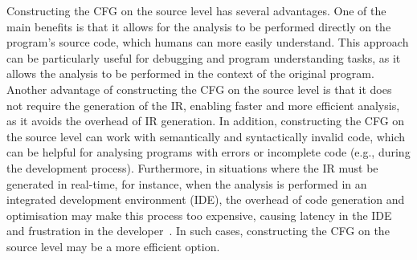 Constructing the CFG on the source level has several advantages.
One of the main beneﬁts is that it allows for the analysis to be performed directly on 
the program's source code, which humans can more easily understand.
This approach can be particularly useful for debugging and program understanding tasks,
as it allows the analysis to be performed in the context of the original program.
Another advantage of constructing the CFG on the source level is that it does not
require the generation of the IR, enabling faster and more efficient analysis,
as it avoids the overhead of IR generation.
In addition, constructing the CFG on the source level can work with semantically
and syntactically invalid code, which can be helpful for analysing programs with
errors or incomplete code (e.g., during the development process).
Furthermore, in situations where the IR must be generated in real-time,
for instance, when the analysis is performed in an integrated development environment (IDE),
the overhead of code generation and optimisation may make this process too expensive,
causing latency in the IDE and frustration in the developer~\cite{piskachev2022far}.
In such cases, constructing the CFG on the source level
may be a more efficient option.

